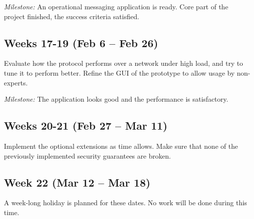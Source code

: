 \documentclass[a4paper, 12pt]{report}
\begin{document}
\begin{appendices}
\vspace{0.7\baselineskip}
\noindent
\textit{Milestone:} An operational messaging application is ready. Core part of the project finished, the success criteria satisfied.


\subsection*{Weeks 17-19 (Feb 6 -- Feb 26)}
Evaluate how the protocol performs over a network under high load, and try to tune it to perform better. Refine the GUI of the prototype to allow usage by non-experts.

\vspace{0.7\baselineskip}
\noindent
\textit{Milestone:} The application looks good and the performance is satisfactory.

\subsection*{Weeks 20-21 (Feb 27 -- Mar 11)}
Implement the optional extensions as time allows. Make sure that none of the previously implemented security guarantees are broken.

\subsection*{Week 22 (Mar 12 -- Mar 18)}
A week-long holiday is planned for these dates. No work will be done during this time.






\end{appendices}
\end{document}
